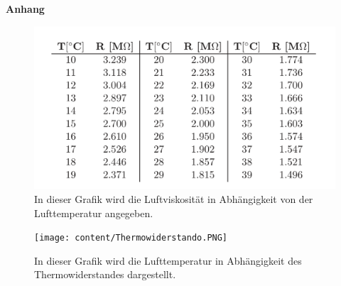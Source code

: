 \newpage

\Large\textbf{Anhang}


%    
%
%
%    

\begin{figure}
    \centering
    \includegraphics{content/Thermowiderstand.PNG}
    \caption{In dieser Grafik wird die Luftviskosität in Abhängigkeit von der Lufttemperatur angegeben. \cite{v503}}
    \label{fig:viskosität}
\end{figure}

\begin{figure}
    \centering
    \texttt{[image: content/Thermowiderstando.PNG]}
    \caption{In dieser Grafik wird die Lufttemperatur in Abhängigkeit des Thermowiderstandes dargestellt. \cite{v503}}
    \label{fig:Temperatur}
\end{figure}